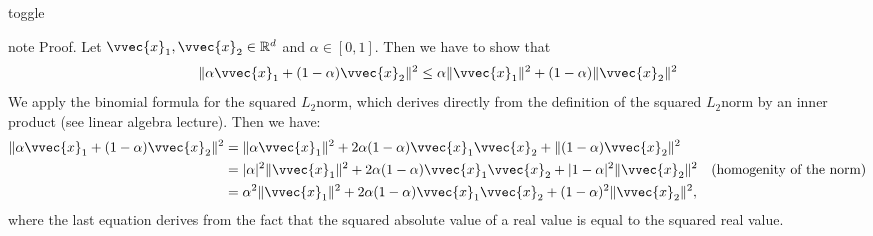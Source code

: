 \documentclass[letterpaper,10pt,english]{jupyterBook}
\begin{document}
\begin{sphinxuseclass}{toggle}
\begin{sphinxadmonition}{note}
\sphinxAtStartPar
Proof. Let \(\vvec{x}_1,\vvec{x}_2\in\mathbb{R}^d\) and \(\alpha\in[0,1]\). Then we have to show  that
\begin{equation}\label{equation:optimization_convex:eq:convex}
\begin{split}\begin{align}
    \lVert\alpha\vvec{x}_1 +(1-\alpha)\vvec{x}_2\rVert^2 \leq  \alpha\lVert\vvec{x}_1\rVert^2 + (1-\alpha)\lVert\vvec{x}_2\rVert^2
\end{align}\end{split}
\end{equation}
\sphinxAtStartPar
We apply the binomial formula for the squared \(L_2\)\sphinxhyphen{}norm, which derives directly from the definition of the squared \(L_2\)\sphinxhyphen{}norm by an inner product (see linear algebra lecture). Then we have:
\begin{equation}\label{equation:optimization_convex:eq:term}
\begin{split}\begin{align}
    \lVert\alpha\vvec{x}_1 +(1-\alpha)\vvec{x}_2\rVert^2 &=
    \lVert\alpha\vvec{x}_1\rVert^2 +2\alpha(1-\alpha)\vvec{x}_1\vvec{x}_2 +\lVert(1-\alpha)\vvec{x}_2\rVert^2\nonumber\\
    &=
    \lvert\alpha\rvert^2\lVert\vvec{x}_1\rVert^2 +2\alpha(1-\alpha)\vvec{x}_1\vvec{x}_2 +\lvert 1-\alpha\rvert^2\lVert\vvec{x}_2\rVert^2 &\text{(homogenity of the norm)}\nonumber\\
    &=
    \alpha^2\lVert\vvec{x}_1\rVert^2 +2\alpha(1-\alpha)\vvec{x}_1\vvec{x}_2 +( 1-\alpha)^2\lVert\vvec{x}_2\rVert^2,
\end{align}\end{split}
\end{equation}
\sphinxAtStartPar
where the last equation derives from the fact that the squared absolute value of a real value is equal to the  squared real value.


\end{sphinxadmonition}
\end{sphinxuseclass}
\end{document}
